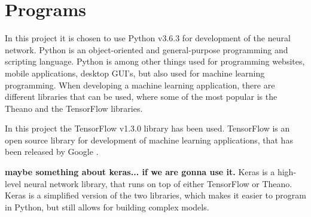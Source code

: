 \section{Programs}

In this project it is chosen to use Python v3.6.3 for development of the neural network.  
Python is an object-oriented and general-purpose programming and scripting language. Python is among other things used for programming websites, mobile applications, desktop GUI's, but also used for machine learning programming.
When developing a machine learning application, there are different libraries that can be used, where some of the most popular is the Theano and the TensorFlow libraries.\citep{Swamynathan2017}

In this project the TensorFlow v1.3.0 library has been used. 
TensorFlow is an open source library for development of machine learning applications, that has been released by Google \citep{Swamynathan2017}. 


\textbf{maybe something about keras... if we are gonna use it.  }
Keras is a high-level neural network library, that runs on top of either TensorFlow or Theano. Keras is a simplified version of the two libraries, which makes it easier to program in Python, but still allows for building complex models.\citep{Swamynathan2017}  